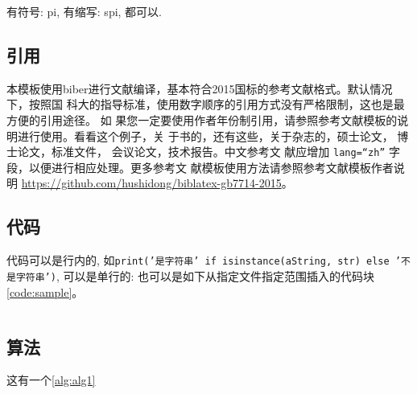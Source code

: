 有符号: \gls{pi}, 有缩写: \gls{spi}, 都可以.

\subsection{引用}
本模板使用biber进行文献编译，基本符合2015国标的参考文献格式。默认情况下，按照国
科大的指导标准，使用数字顺序的引用方式没有严格限制，这也是最方便的引用途径。 如
果您一定要使用作者年份制引用，请参照参考文献模板的说明进行使用。看看这个例子，关
于书的\cite{tex, companion, ColdSources}，还有这些\cite{Krasnogor2004e, clzs,
zjsw}，关于杂志的\cite{ELIDRISSI94, MELLINGER96, SHELL02}，硕士论文\cite{zhubajie, metamori2004}，
博士论文\cite{shaheshang, FistSystem01}，标准文件\cite{IEEE-1363}，
会议论文\cite{DPMG,kocher99}，技术报告\cite{NPB2}。中文参考文
献\cite{cnarticle}应增加 \texttt{lang=``zh''} 字段，以便进行相应处理。更多参考文
献模板使用方法请参照参考文献模板作者说明
\url{https://github.com/hushidong/biblatex-gb7714-2015}。

\subsection{代码}

代码可以是行内的, 如\texttt{print('是字符串' if isinstance(aString, str) else '不是字符串')}, 可以是单行的:
也可以是如下从指定文件指定范围插入的代码块\autoref{code:sample}。
\begin{listing}[H]
    \inputminted[firstline=16, lastline=37]{c}{assets/example.c}
    \label{code:sample}
\end{listing}

\subsection{算法}

这有一个\autoref{alg:alg1}

